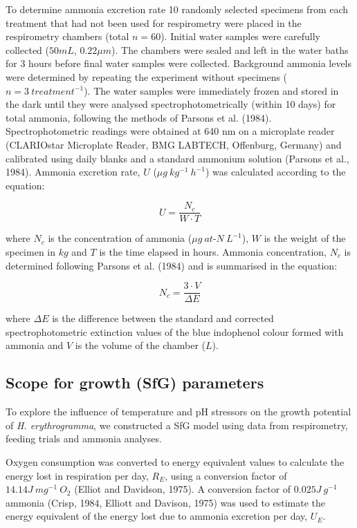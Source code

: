 \documentclass[oneside, a4paper]{memoir}
\theoremstyle{definition}
\theoremstyle{definition}
\theoremstyle{definition}
\theoremstyle{remark}
\begin{document}
To determine ammonia excretion rate 10 randomly selected specimens from
each treatment that had not been used for respirometry were placed in
the respirometry chambers (total \(n = 60\)). Initial water samples were
carefully collected (\(50 mL\), \(0.22 \mu m\)). The chambers were
sealed and left in the water baths for 3 hours before final water
samples were collected. Background ammonia levels were determined by
repeating the experiment without specimens (\(n = 3\ treatment^{-1}\)).
The water samples were immediately frozen and stored in the dark until
they were analysed spectrophotometrically (within 10 days) for total
ammonia, following the methods of Parsons et al. (1984).
Spectrophotometric readings were obtained at 640 nm on a microplate
reader (CLARIOstar Microplate Reader, BMG LABTECH, Offenburg, Germany)
and calibrated using daily blanks and a standard ammonium solution
(Parsons et al., 1984). Ammonia excretion rate, \(U\)
(\(\mu g\ kg^{-1}\ h^{-1}\)) was calculated according to the equation:

\begin{equation}
  U = \frac{N_c}{W \cdot T}
  \label{eq:u}
\end{equation}

where \(N_c\) is the concentration of ammonia
(\(\mu g\ at\mbox{-}N\ L^{-1}\)), \(W\) is the weight of the specimen in
\(kg\) and \(T\) is the time elapsed in hours. Ammonia concentration,
\(N_c\) is determined following Parsons et al. (1984) and is summarised
in the equation:

\begin{equation} 
  N_c = \frac{3 \cdot V}{\Delta E}
  \label{eq:nc}
\end{equation}

where \(\Delta E\) is the difference between the standard and corrected
spectrophotometric extinction values of the blue indophenol colour
formed with ammonia and \(V\) is the volume of the chamber (\(L\)).

\subsection{Scope for growth (SfG)
parameters}\label{scope-for-growth-sfg-parameters}

To explore the influence of temperature and pH stressors on the growth
potential of \emph{H. erythrogramma}, we constructed a SfG model using
data from respirometry, feeding trials and ammonia analyses.

Oxygen consumption was converted to energy equivalent values to
calculate the energy lost in respiration per day, \(R_E\), using a
conversion factor of \(14.14 J\ mg^{-1}\ O_2\) (Elliot and Davidson,
1975). A conversion factor of \(0.025 J\ g^{-1}\) ammonia (Crisp, 1984,
Elliott and Davison, 1975) was used to estimate the energy equivalent of
the energy lost due to ammonia excretion per day, \(U_E\).
\end{document}
